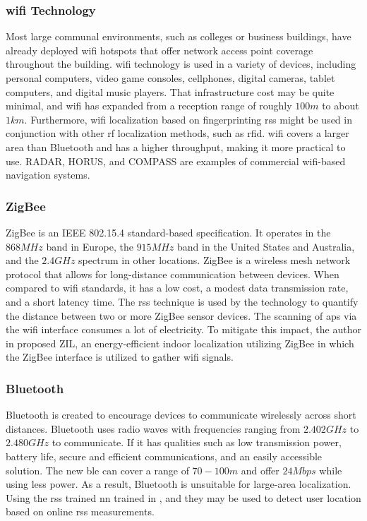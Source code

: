 \subsubsection{\ac{wifi} Technology}
Most large communal environments, such as colleges or business buildings, have already deployed \ac{wifi} hotspots that offer network access point coverage throughout the building.
\ac{wifi} technology is used in a variety of devices, including personal computers, video game consoles, cellphones, digital cameras, tablet computers, and digital music players.
That infrastructure cost may be quite minimal, and \ac{wifi} has expanded from a reception range of roughly $100 m$ to about $1 km$.
Furthermore, \ac{wifi} localization based on fingerprinting \ac{rss} might be used in conjunction with other \ac{rf} localization methods, such as \ac{rfid}\cite{wang2016indoor}.
\ac{wifi} covers a larger area than Bluetooth and has a higher throughput, making it more practical to use.
RADAR\cite{bahl2000radar}, HORUS\cite{bahl2000radar}, and COMPASS\cite{bahl2000radar} are examples of commercial \ac{wifi}-based navigation systems.

\subsubsection{ZigBee}
ZigBee is an IEEE 802.15.4 standard-based specification.
It operates in the $868 MHz$ band in Europe, the $915 MHz$ band in the United States and Australia, and the $2.4 GHz$ spectrum in other locations.
ZigBee is a wireless mesh network protocol that allows for long-distance communication between devices.
When compared to \ac{wifi} standards, it has a low cost, a modest data transmission rate, and a short latency time.
The \ac{rss} technique is used by the technology to quantify the distance between two or more ZigBee sensor devices\cite{sugano2006indoor}.
The scanning of \ac{ap}s via the \ac{wifi} interface consumes a lot of electricity.
To mitigate this impact, the author in \cite{niu2015zil} proposed ZIL, an energy-efficient indoor localization utilizing ZigBee in which the ZigBee interface is utilized to gather \ac{wifi} signals.

\subsubsection{Bluetooth}
Bluetooth is created to encourage devices to communicate wirelessly across short distances.
Bluetooth uses radio waves with frequencies ranging from $2.402 GHz$ to $2.480 GHz$ to communicate.
If it has qualities such as low transmission power, battery life, secure and efficient communications, and an easily accessible solution.
The new \ac{ble} can cover a range of $70-100 m$ and offer $24Mbps$ while using less power\cite{zafari2019survey}.
As a result, Bluetooth is unsuitable for large-area localization.
Using the \ac{rss} trained \ac{nn} trained in \cite{Altini2010BluetoothIL}, and they may be used to detect user location based on online \ac{rss} measurements.

